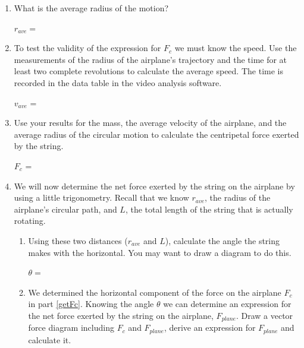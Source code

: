 \begin{enumerate}
\item What is the average radius of the motion? \\
\vspace{2mm}

\hspace{0.5in} $r_{ave} =$

\vspace{5mm}

\item To test the validity of the expression for \( F_{c} \) we must know the
speed. Use the measurements of the radius of the airplane's trajectory and the
time for at least two complete revolutions to calculate the average speed.
The time is recorded in the data table in the video analysis software.
\vspace{5mm}

\hspace{0.5in} \( v_{ave} \) = 
\vspace{5mm}

\item Use your results for the mass, the average velocity of the airplane, and
the average radius of the circular motion to calculate the centripetal force exerted by
the string.\label{getFc}
\vspace{5mm}

\hspace{0.5in} \( F_{c} \) = 
\vspace{5mm}

\item We will now determine the net force exerted by the string on the airplane
by using a little trigonometry.
Recall that we know $r_{ave}$, the radius of the airplane's circular path, and 
$L$, the total length of the string that is actually rotating. 

\begin{enumerate}
\item Using these two distances ($r_{ave}$ and $L$), 
calculate the angle the string makes with
the horizontal. You may want to draw a diagram to do this. \\
\vspace{5mm}

\( \theta  =\)  \vspace{5mm}

\item We determined the horizontal component of the force on the airplane 
\( F_{c} \) in part \ref{getFc}. Knowing the angle \( \theta \) we can determine an
expression for the
net force exerted by the string on the airplane, \( F_{plane} \). Draw a vector
force diagram including \( F_{c} \) and \( F_{plane} \), derive an expression
for \( F_{plane} \) and calculate it. \\
\vspace{5mm}


\end{enumerate}
\end{enumerate}

